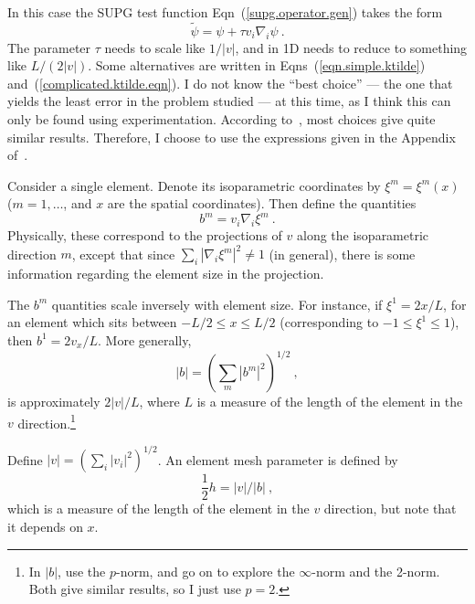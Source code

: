 \documentclass[]{scrreprt}
\begin{document}
In this case the SUPG test function Eqn~(\ref{supg.operator.gen})
takes the form
\begin{equation}
\tilde{\psi} = \psi + \tau v_{i}\nabla_{i}\psi \ .
\end{equation}
The parameter $\tau$ needs to scale like $1/|v|$, and in 1D needs to
reduce to something like $L/(2|v|)$.  Some
alternatives are written in Eqns~(\ref{eqn.simple.ktilde})
and~(\ref{complicated.ktilde.eqn}).  I do not know the ``best choice''
--- the one that yields the least error in the problem studied --- at
this time, as I think this can only be found using experimentation.
According to~\cite{brooks1982}, most choices give quite similar results.
Therefore, I choose to use the expressions given in the Appendix
of~\cite{hughesET1986}.

Consider a single element.  Denote its isoparametric coordinates by
$\xi^{m} = \xi^{m}(x)$ ($m=1,\ldots$, and $x$ are
the spatial coordinates).  Then define the quantities
\begin{equation}
b^{m} = v_{i}\nabla_{i}\xi^{m} \ .
\label{eqn.b.params.supg}
\end{equation}
Physically, these correspond to the projections of $v$ along the
isoparametric direction $m$, except that since
$\sum_{i}|\nabla_{i}\xi^{m}|^{2} \neq 1$ (in general), there is some
information regarding the element size in the projection.

The $b^{m}$ quantities scale inversely with element size.  For
instance, if $\xi^{1} = 2x/L$, for an element which sits between $-L/2
\leq x \leq L/2$ (corresponding to $-1\leq \xi^{1} \leq 1$), then
$b^{1} = 2v_{x}/L$.  More generally,
\begin{equation}
|b|=(\sum_{m}|b^{m}|^{2})^{1/2} \ ,
\end{equation}
is approximately $2|v|/L$, where $L$ is a measure of the length of the
element in the $v$ direction.\footnote{In $|b|$, \cite{hughesET1986} use the
$p$-norm, and go on to explore the $\infty$-norm and the 2-norm.  Both
give similar results, so I just use $p=2$.}

Define $|v|=(\sum_{i}|v_{i}|^{2})^{1/2}$.  An element mesh parameter
is defined by
\begin{equation}
\mbox{$\frac{1}{2}$}h = |v|/|b| \ ,
\end{equation}
which is a measure of the length of the element in the $v$ direction,
but note that it depends on $x$.
\end{document}
